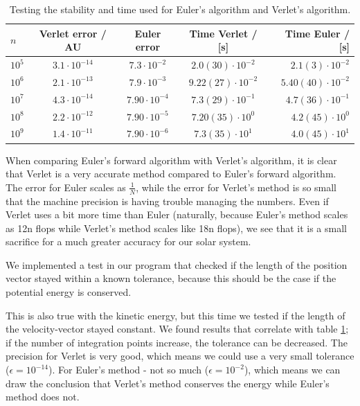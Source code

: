 \documentclass{article}
\begin{document}
\begin{table}[H]
    \centering
    \begin{tabular}{|l|c|c|c|r|}
    \hline
     $n$ & Verlet error / AU & Euler error & Time Verlet / [s] & Time Euler / [s]\\
     \hline
      $10^5$  & $3.1\cdot10^{-14}$  & $7.3\cdot10^{-2}$ & $ 2.0 (30) \cdot 10^{-2}$ & $ 2.1 (3) \cdot 10^{-2}$\\
      $10^6$  & $2.1\cdot10^{-13}$  & $7.9\cdot10^{-3}$ & $ 9.22 (27) \cdot 10^{-2}$ & $ 5.40 (40)\cdot 10^{-2}$\\
      $10^7$  & $4.3\cdot10^{-14}$  & $7.90\cdot10^{-4}$ & $ 7.3 (29) \cdot 10^{-1}$ & $ 4.7 (36) \cdot 10^{-1}$\\
      $10^8$  & $2.2\cdot10^{-12}$  & $7.90\cdot10^{-5}$ & $ 7.20 (35) \cdot 10^{0}$ & $ 4.2 (45) \cdot 10^{0}$\\
      $10^9$  & $1.4\cdot10^{-11}$  & $7.90\cdot10^{-6}$ & $ 7.3 (35) \cdot 10^{1}$ & $ 4.0 (45) \cdot 10^{1}$\\
      \hline
    \end{tabular}
    \caption{Testing the stability and time used for Euler's algorithm and Verlet's algorithm.}
    \label{stability}
\end{table}

When comparing Euler's forward algorithm with Verlet's algorithm, it is clear that Verlet is a very accurate method compared to Euler's forward algorithm. The error for Euler scales as $\frac{1}{N}$, while the error for Verlet's method is so small that the machine precision is having trouble managing the numbers. Even if Verlet uses a bit more time than Euler (naturally, because Euler's method scales as 12n flops while Verlet's method scales like 18n flops), we see that it is a small sacrifice for a much greater accuracy for our solar system.

We implemented a test in our program that checked if the length of the position vector stayed within a known tolerance, because this should be the case if the potential energy is conserved.

This is also true with the kinetic energy, but this time we tested if the length of the velocity-vector stayed constant. We found results that correlate with table \ref{stability}; if the number of integration points increase, the tolerance can be decreased. The precision for Verlet is very good, which means we could use a very small tolerance ($\epsilon = 10^{-14}$). For Euler's method - not so much ($\epsilon = 10^{-2}$), which means we can draw the conclusion that Verlet's method conserves the energy while Euler's method does not.
\end{document}
